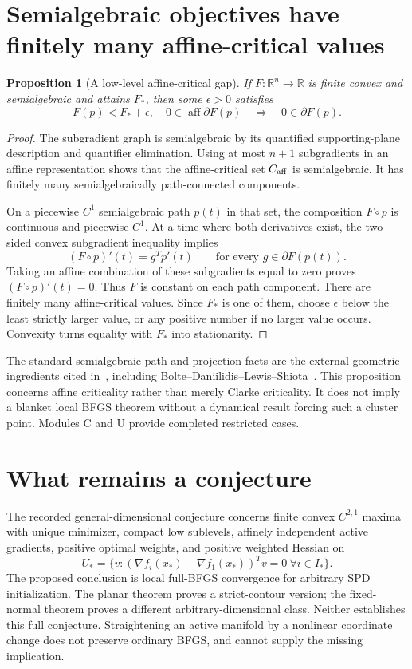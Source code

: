 \documentclass[10pt,oneside,openany]{book}
\newtheorem{proposition}{Proposition}[chapter]
\theoremstyle{remark}\newtheorem{remark}{Remark}[chapter]
\begin{document}
\section{Semialgebraic objectives have finitely many affine-critical values}
\begin{proposition}[A low-level affine-critical gap]\label{A:semialgebraic}
If $F:\mathbb R^n\to\mathbb R$ is finite convex and semialgebraic and attains $F_*$, then some $\epsilon>0$ satisfies
\[
 F(p)<F_*+\epsilon,\quad0\in\operatorname{aff}\partial F(p)
 \quad\Longrightarrow\quad0\in\partial F(p).
\]
\end{proposition}
\begin{proof}
The subgradient graph is semialgebraic by its quantified supporting-plane description and quantifier elimination. Using at most $n+1$ subgradients in an affine representation shows that the affine-critical set $C_{\rm aff}$ is semialgebraic. It has finitely many semialgebraically path-connected components.

On a piecewise $C^1$ semialgebraic path $p(t)$ in that set, the composition $F\circ p$ is continuous and piecewise $C^1$. At a time where both derivatives exist, the two-sided convex subgradient inequality implies
\[
 (F\circ p)'(t)=g^Tp'(t)\qquad\text{for every }g\in\partial F(p(t)).
\]
Taking an affine combination of these subgradients equal to zero proves $(F\circ p)'(t)=0$. Thus $F$ is constant on each path component. There are finitely many affine-critical values. Since $F_*$ is one of them, choose $\epsilon$ below the least strictly larger value, or any positive number if no larger value occurs. Convexity turns equality with $F_*$ into stationarity.
\end{proof}
The standard semialgebraic path and projection facts are the external geometric ingredients cited in~\cite{SA}, including Bolte--Daniilidis--Lewis--Shiota~\cite{BDLS}. This proposition concerns affine criticality rather than merely Clarke criticality. It does not imply a blanket local BFGS theorem without a dynamical result forcing such a cluster point. Modules C and U provide completed restricted cases.

\section{What remains a conjecture}
The recorded general-dimensional conjecture concerns finite convex $C^{2,1}$ maxima with unique minimizer, compact low sublevels, affinely independent active gradients, positive optimal weights, and positive weighted Hessian on
\[
 U_* =\{v:(\nabla f_i(x_*)-\nabla f_1(x_*))^Tv=0\ \forall i\in I_*\}.
\]
The proposed conclusion is local full-BFGS convergence for arbitrary SPD initialization. The planar theorem proves a strict-contour version; the fixed-normal theorem proves a different arbitrary-dimensional class. Neither establishes this full conjecture. Straightening an active manifold by a nonlinear coordinate change does not preserve ordinary BFGS, and cannot supply the missing implication.
\end{document}
